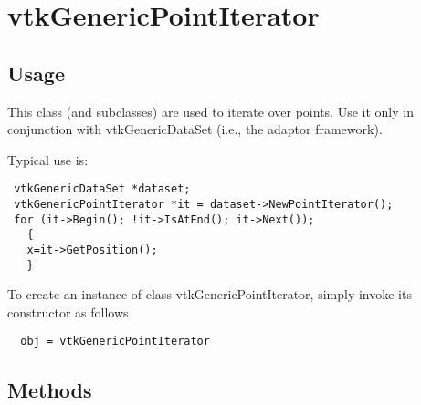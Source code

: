 \section{vtkGenericPointIterator}

\subsection{Usage}

 This class (and subclasses) are used to iterate over points. Use it
 only in conjunction with vtkGenericDataSet (i.e., the adaptor framework).

 Typical use is:
 \begin{verbatim}
 vtkGenericDataSet *dataset;
 vtkGenericPointIterator *it = dataset->NewPointIterator();
 for (it->Begin(); !it->IsAtEnd(); it->Next());
   {
   x=it->GetPosition();
   }
 \end{verbatim}

To create an instance of class vtkGenericPointIterator, simply
invoke its constructor as follows
\begin{verbatim}
  obj = vtkGenericPointIterator
\end{verbatim}
\subsection{Methods}

